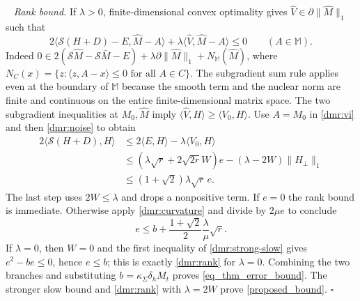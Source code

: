 \documentclass[12pt]{article}
\newenvironment{pf}{{\noindent\it Proof}\ }{\hfill $\square$\par}
\begin{document}
\begin{pf}
\noindent\textit{Rank bound.}
If $\lambda>0$, finite-dimensional convex optimality gives
$\widehat V\in\partial\|\widehat M\|_1$ such that
\begin{equation}\label{dmr:vi}
 2\langle\mathcal S(H+D)-E,\widehat M-A\rangle
 +\lambda\langle\widehat V,\widehat M-A\rangle\le0
 \qquad(A\in\mathbb M).
\end{equation}
Indeed $0\in2(\mathcal S\widehat M-\mathcal S\bar M-E)
+\lambda\partial\|\widehat M\|_1+N_{\mathbb M}(\widehat M)$,
where $N_C(x)=\{z:\langle z,A-x\rangle\le0\text{ for all }A\in C\}$.
The subgradient sum rule applies even at the boundary of $\mathbb M$
because the smooth term and the nuclear norm are finite and continuous
on the entire finite-dimensional matrix space.
The two subgradient inequalities at $M_0,\widehat M$ imply
$\langle\widehat V,H\rangle\ge\langle V_0,H\rangle$.
Use $A=M_0$ in \eqref{dmr:vi} and then \eqref{dmr:noise} to obtain
\begin{align*}
 2\langle\mathcal S(H+D),H\rangle
 &\le2\langle E,H\rangle-\lambda\langle V_0,H\rangle\\
 &\le(\lambda\sqrt r+2\sqrt{2r}W)e
       -(\lambda-2W)\|H_\perp\|_1\\
 &\le(1+\sqrt2)\lambda\sqrt r\,e.
\end{align*}
The last step uses $2W\le\lambda$ and drops a nonpositive term.
If $e=0$ the rank bound is immediate. Otherwise apply
\eqref{dmr:curvature} and divide by $2\mu e$ to conclude
\begin{equation}\label{dmr:rank}
 e\le b+\frac{1+\sqrt2}{2}\frac\lambda\mu\sqrt r.
\end{equation}
If $\lambda=0$, then $W=0$ and the first inequality of
\eqref{dmr:strong-slow} gives $e^2-be\le0$, hence $e\le b$;
this is exactly \eqref{dmr:rank} for $\lambda=0$.
Combining the two branches and substituting $b=\kappa_\Sigma\delta_hM_t$
proves \eqref{eq_thm_error_bound}. The stronger slow bound and
\eqref{dmr:rank} with $\lambda=2W$ prove \eqref{proposed_bound}.
\end{pf}
\end{document}
